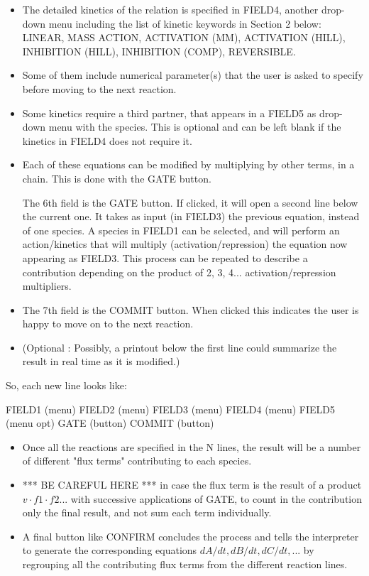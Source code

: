 \documentclass[11pt, oneside]{article}
\begin{document}
 \begin{itemize}
\item The detailed kinetics of the relation is specified in FIELD4, another drop-down menu including the list of kinetic keywords in Section 2 below: LINEAR, MASS ACTION, ACTIVATION (MM), ACTIVATION (HILL), INHIBITION (HILL), INHIBITION (COMP), REVERSIBLE.

\item Some of them include numerical parameter(s) that the user is asked to specify before moving to the next reaction.

\item Some kinetics require a third partner, that appears in a FIELD5 as drop-down menu with the species. This is optional and can be left blank if the kinetics in FIELD4 does not require it.

\item Each of these equations can be modified by multiplying by other terms, in a chain. This is done with the GATE button.

The 6th field is the GATE button. If clicked, it will open a second line below the current one. It takes as input (in FIELD3) the previous equation, instead of one species. A species in FIELD1 can be selected, and will perform an action/kinetics that will multiply (activation/repression) the equation now appearing as FIELD3. This process can be repeated to describe a contribution depending on the product of 2, 3, 4... activation/repression multipliers.

\item The 7th field is the COMMIT button. When clicked this indicates the user is happy to move on to the next reaction. 

\item (Optional : Possibly, a printout below the first line could summarize the result in real time as it is modified.) 

\end{itemize} 

So, each new line looks like:

FIELD1 (menu) FIELD2 (menu) FIELD3 (menu) FIELD4 (menu) FIELD5 (menu opt) GATE (button) COMMIT (button)

\begin{itemize}
\item Once all the reactions are specified in the N lines, the result will be a number of different "flux terms" contributing to each species.

\item *** BE CAREFUL HERE *** in case the flux term is the result of a product $v \cdot f1 \cdot f2 ...$ with successive applications of GATE, to count in the contribution only the final result, and not sum each term individually.

\item A final button like CONFIRM concludes the process and tells the interpreter to generate the corresponding equations $dA/dt, dB/dt, dC/dt, ...$ by regrouping all the contributing flux terms from the different reaction lines.
\end{itemize}
\end{document}
